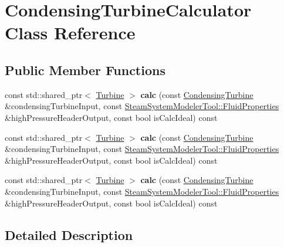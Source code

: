 \hypertarget{class_condensing_turbine_calculator}{}\section{Condensing\+Turbine\+Calculator Class Reference}
\label{class_condensing_turbine_calculator}
\subsection*{Public Member Functions}
\begin{DoxyCompactItemize}
\item 
\mbox{\label{class_condensing_turbine_calculator_ae67f377254d388162ac68f06b3b91018}} 
const std\+::shared\+\_\+ptr$<$ \hyperlink{class_turbine}{Turbine} $>$ {\bfseries calc} (const \hyperlink{class_condensing_turbine}{Condensing\+Turbine} \&condensing\+Turbine\+Input, const \hyperlink{struct_steam_system_modeler_tool_1_1_fluid_properties}{Steam\+System\+Modeler\+Tool\+::\+Fluid\+Properties} \&high\+Pressure\+Header\+Output, const bool is\+Calc\+Ideal) const
\item 
\mbox{\label{class_condensing_turbine_calculator_a639fa75b91993eee0964734e6d667479}} 
const std\+::shared\+\_\+ptr$<$ \hyperlink{class_turbine}{Turbine} $>$ {\bfseries calc} (const \hyperlink{class_condensing_turbine}{Condensing\+Turbine} \&condensing\+Turbine\+Input, const \hyperlink{struct_steam_system_modeler_tool_1_1_fluid_properties}{Steam\+System\+Modeler\+Tool\+::\+Fluid\+Properties} \&high\+Pressure\+Header\+Output, const bool is\+Calc\+Ideal) const
\item 
\mbox{\label{class_condensing_turbine_calculator_a639fa75b91993eee0964734e6d667479}} 
const std\+::shared\+\_\+ptr$<$ \hyperlink{class_turbine}{Turbine} $>$ {\bfseries calc} (const \hyperlink{class_condensing_turbine}{Condensing\+Turbine} \&condensing\+Turbine\+Input, const \hyperlink{struct_steam_system_modeler_tool_1_1_fluid_properties}{Steam\+System\+Modeler\+Tool\+::\+Fluid\+Properties} \&high\+Pressure\+Header\+Output, const bool is\+Calc\+Ideal) const
\end{DoxyCompactItemize}


\subsection{Detailed Description}


